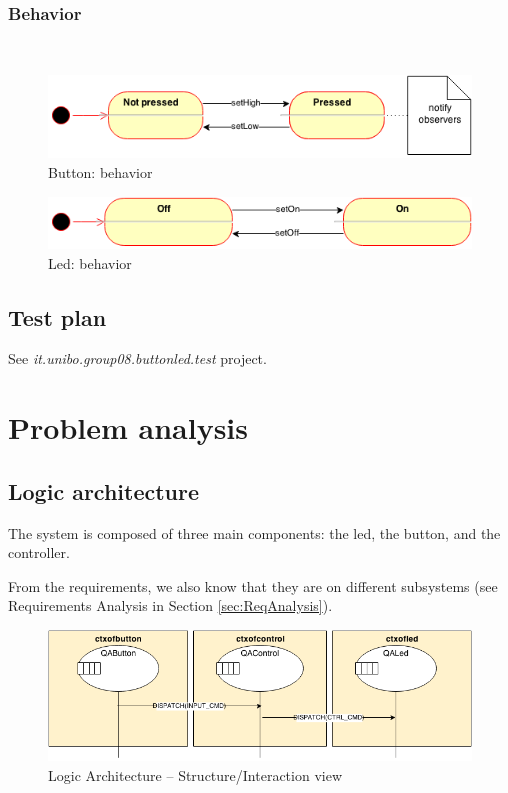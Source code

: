 \documentclass{article}
\newcommand{\labelsec}[1]{\label{sec:#1}}
\begin{document}
\subsubsection{Behavior}\\

\begin{figure}[H]
    \centering
     \includegraphics[scale=0.65]{img/ISS-FSM-Button.png}
    \caption{Button: behavior}
\end{figure}

\begin{figure}[H]
    \centering
     \includegraphics[scale=0.65]{img/ISS-FSM-Led.png}
    \caption{Led: behavior}
\end{figure}


\subsection{Test plan}

 See \emph{it.unibo.group08.buttonled.test} project.

\section{Problem analysis}
\labelsec{ProblemAnalysis}


\subsection{Logic architecture}

The system is composed of three main components: the led, the button, and the
controller.

From the requirements, we also know that they are on different subsystems (see
Requirements Analysis in Section \ref{sec:ReqAnalysis}).


\begin{figure}[H]
    \centering
     \includegraphics[scale=0.75]{img/BLSLogicalArch-ActorBased.png}
    \caption{Logic Architecture -- Structure/Interaction view}
    \label{fig:logicarch_inter}
\end{figure}
\end{document}
